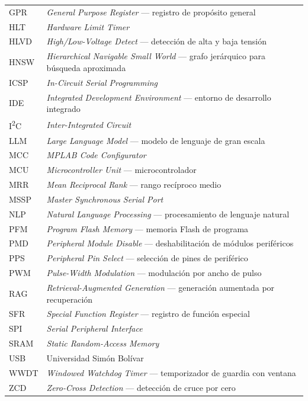 \begin{longtable}{@{}p{}p{}@{}}
GPR     & \textit{General Purpose Register} — registro de propósito general \\
HLT     & \textit{Hardware Limit Timer} \\
HLVD    & \textit{High/Low-Voltage Detect} — detección de alta y baja tensión \\
HNSW    & \textit{Hierarchical Navigable Small World} — grafo jerárquico para búsqueda aproximada \\
ICSP    & \textit{In-Circuit Serial Programming} \\
IDE     & \textit{Integrated Development Environment} — entorno de desarrollo integrado \\
I\textsuperscript{2}C & \textit{Inter-Integrated Circuit} \\
LLM     & \textit{Large Language Model} — modelo de lenguaje de gran escala \\
MCC     & \textit{MPLAB Code Configurator} \\
MCU     & \textit{Microcontroller Unit} — microcontrolador \\
MRR     & \textit{Mean Reciprocal Rank} — rango recíproco medio \\
MSSP    & \textit{Master Synchronous Serial Port} \\
NLP     & \textit{Natural Language Processing} — procesamiento de lenguaje natural \\
PFM     & \textit{Program Flash Memory} — memoria Flash de programa \\
PMD     & \textit{Peripheral Module Disable} — deshabilitación de módulos periféricos \\
PPS     & \textit{Peripheral Pin Select} — selección de pines de periférico \\
PWM     & \textit{Pulse-Width Modulation} — modulación por ancho de pulso \\
RAG     & \textit{Retrieval-Augmented Generation} — generación aumentada por recuperación \\
SFR     & \textit{Special Function Register} — registro de función especial \\
SPI     & \textit{Serial Peripheral Interface} \\
SRAM    & \textit{Static Random-Access Memory} \\
USB     & Universidad Simón Bolívar \\
WWDT    & \textit{Windowed Watchdog Timer} — temporizador de guardia con ventana \\
ZCD     & \textit{Zero-Cross Detection} — detección de cruce por cero \\
\end{longtable}
